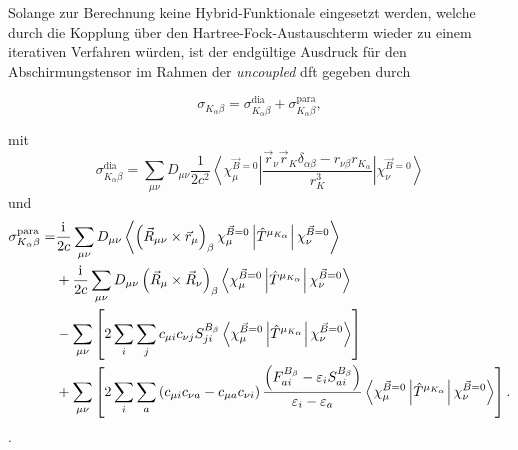 Solange zur Berechnung keine Hybrid-Funktionale eingesetzt werden, welche durch die Kopplung über den Hartree-Fock-Austauschterm wieder zu einem iterativen Verfahren würden, ist  der endgültige Ausdruck für den Abschirmungstensor im Rahmen der \textit{uncoupled} \ac{dft} gegeben durch

\begin{equation}
\sigma_{K_\alpha\beta}=\sigma_{K_\alpha\beta}^{\textrm{dia}}+\sigma_{K_\alpha\beta}^{\textrm{para}},
\end{equation}

mit 
\begin{equation}
\sigma_{K_\alpha\beta}^{\textrm{dia}}=\sum_{\mu\nu}D_{\mu\nu}\frac{1}{2c^2}\left.\left\langle\chi_\mu^{\vec{B}=0}\right\vert\frac{\vec{r}_\nu\vec{r}_K\delta_{\alpha\beta}-r_{\nu \beta}r_{K_\alpha}}{r_K^3}\left\vert\chi_\nu^{\vec{B}=0}\right\rangle\right.
\end{equation}
und
\begin{equation}
\begin{aligned}
\sigma_{K_\alpha\beta}^{\textrm{para}}=&\frac{\mathrm{i}\mkern1mu}{2c}\sum_{\mu\nu}D_{\mu\nu}\left\langle\left(\vec{R}_{\mu\nu}\times\vec{r}_\mu\right)_\beta\chi_\mu^{\vec{B}=0}\left\vert\hat{T}^{\mu_{K_\alpha}}\right\vert\chi_\nu^{\vec{B}=0}\right\rangle\\
&+\frac{\mathrm{i}\mkern1mu}{2c}\sum_{\mu\nu}D_{\mu\nu}\left(\vec{R}_{\mu}\times\vec{R}_\nu\right)_\beta\left\langle\chi_\mu^{\vec{B}=0}\left\vert\hat{T}^{\mu_{K_\alpha}}\right\vert\chi_\nu^{\vec{B}=0}\right\rangle\\
&-\sum_{\mu\nu}\left[2\sum_i\sum_j c_{\mu i}c_{\nu j} S_{ji}^{B_\beta}\left\langle\chi_\mu^{\vec{B}=0}\left\vert\hat{T}^{\mu_{K_\alpha}}\right\vert\chi_\nu^{\vec{B}=0}\right\rangle\right]\\
&+\sum_{\mu\nu}\left[2\sum_i\sum_a\left(c_{\mu i}c_{\nu a}-c_{\mu a}c_{\nu i}\right)\frac{\left(F_{ai}^{B_\beta}-\varepsilon_i S_{ai}^{B_\beta}\right)}{\varepsilon_i-\varepsilon_a}\left\langle\chi_\mu^{\vec{B}=0}\left\vert\hat{T}^{\mu_{K_\alpha}}\right\vert\chi_\nu^{\vec{B}=0}\right\rangle\right].
\end{aligned}
\end{equation}
.

